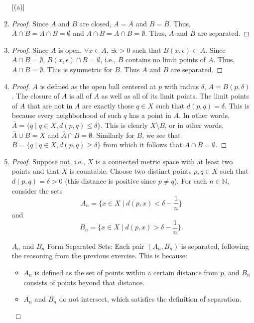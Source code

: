 \documentclass[12pt]{article}
\begin{document}
\begin{exercise}{19}
    \begin{enumerate} [(a)]
        \item \begin{proof}
            Since $A$ and $B$ are closed, $A = \overline{A}$ and $B = \overline{B}$. Thus, $\overline{A} \cap B = A \cap B = \emptyset$ and $A \cap \overline{B} = A \cap B = \emptyset$. Thus, $A$ and $B$ are separated. 
        \end{proof}
        \item \begin{proof}
            Since $A$ is open, $\forall x \in A$, $\exists \epsilon > 0$ such that $B(x, \epsilon) \subset A$. Since $A \cap B = \emptyset$, $B(x, \epsilon) \cap B = \emptyset$, i.e., $B$ contains no limit points of $A$. Thus, $\overline{A} \cap B = \emptyset$. This is symmetric for $B$. Thus $A$ and $B$ are separated. 
        \end{proof}
        \item \begin{proof}
            $A$ is defined as the open ball centered at $p$ with radius $\delta$, $A = B(p, \delta)$. The closure of $A$ is all of $A$ as well as all of its limit points. The limit points of $A$ that are not in $A$ are exactly those $q \in X$ such that $d(p, q) = \delta$. This is because every neighborhood of such $q$ has a point in $A$. In other words, $\overline{A} = \{ q \mid q \in X, d(p, q) \le \delta \}$. This is clearly $X \setminus B$, or in other words, $\overline{A} \cup B = X$ and $\overline{A} \cap B = \emptyset$. Similarly for $B$, we see that $\overline{B} = \{ q \mid q \in X, d(p, q) \ge \delta \}$ from which it follows that $A \cap \overline{B} = \emptyset$.  
        \end{proof}
        \item \begin{proof}
            Suppose not, i.e., \( X \) is a connected metric space with at least two points and that \( X \) is countable. Choose two distinct points \( p, q \in X \) such that \( d(p, q) = \delta > 0 \) (this distance is positive since \( p \neq q \)). For each \( n \in \mathbb{N} \), consider the sets
    \[
    A_n = \{ x \in X \mid d(p, x) < \delta - \frac{1}{n} \}
    \]
    and
    \[
    B_n = \{ x \in X \mid d(p, x) > \delta - \frac{1}{n} \}.
    \]

    \( A_n \) and \( B_n \) Form Separated Sets: Each pair \( (A_n, B_n) \) is separated, following the reasoning from the previous exercise. This is because:
    \begin{itemize}
        \item \( A_n \) is defined as the set of points within a certain distance from \( p \), and \( B_n \) consists of points beyond that distance.
        \item \( \overline{A_n} \) and \( \overline{B_n} \) do not intersect, which satisfies the definition of separation.
    \end{itemize}


\end{proof}
\end{enumerate}
\end{exercise}
\end{document}
